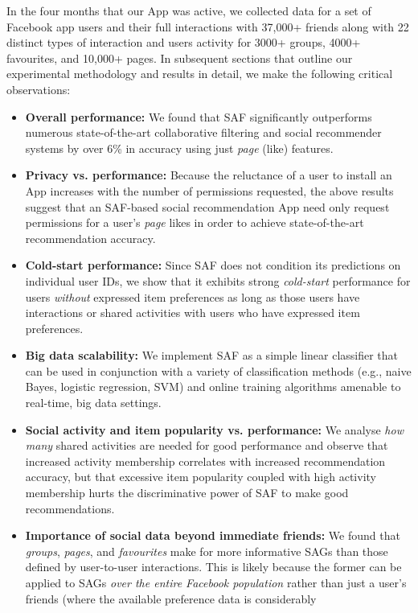 In the four months that our App was active, we collected data for a
set of Facebook app users and their full interactions with 37,000+
friends along with 22 distinct types of interaction and users activity
for 3000+ groups, 4000+ favourites, and 10,000+ pages.  In subsequent
sections that outline our experimental methodology and results in
detail, we make the following critical observations:
\begin{itemize}
\item {\bf Overall performance:} We found that SAF significantly 
outperforms numerous state-of-the-art collaborative filtering and
social recommender systems by over 6\% in accuracy using
just \emph{page} (like) features.  
\item {\bf Privacy vs. performance:} 
Because the reluctance of a user to install an App increases with the
number of permissions requested, the above results suggest that an
SAF-based social recommendation App need only request permissions for
a user's \emph{page} likes in order to achieve state-of-the-art
recommendation accuracy.
\item {\bf Cold-start performance:}
Since SAF does not condition its predictions on individual
user IDs, we show that it exhibits strong \emph{cold-start}
performance for users \emph{without} expressed item preferences as long as those users
have interactions or shared activities with users who have
expressed item preferences.
\item {\bf Big data scalability:} We implement SAF as 
a simple linear classifier that
can be used in conjunction with a variety of classification methods (e.g., naive
Bayes, logistic regression, SVM) and online training algorithms
amenable to real-time, big data settings.
\item {\bf Social activity and item popularity vs. performance:} 
We analyse \emph{how many} shared activities are needed for
good performance and observe that increased activity membership correlates
with increased recommendation accuracy, but that excessive item popularity
coupled with high activity membership hurts the discriminative power
of SAF to make good recommendations.
\item {\bf Importance of social data beyond immediate friends:} 
We found that \emph{groups}, \emph{pages}, and \emph{favourites} 
make for more informative SAGs than those defined by user-to-user
interactions.  This is likely because the former can be applied to
SAGs \emph{over the entire Facebook population} rather than just a
user's friends (where the available preference data is considerably

\end{itemize}
